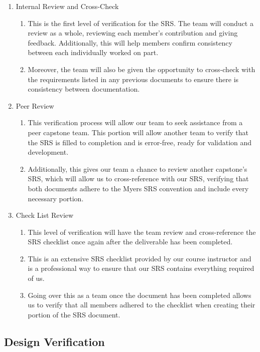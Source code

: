 \documentclass[12pt, titlepage]{article}
\begin{document}
\begin{enumerate}
\item Internal Review and Cross-Check
\begin{enumerate}
\item This is the first level of verification for the SRS. The team
will conduct a review as a whole, reviewing each member’s contribution
and giving feedback. Additionally, this will help members confirm
consistency between each individually worked on part.
\item Moreover, the team will also be given the opportunity to
cross-check with the requirements listed in any previous documents
to ensure there is consistency between documentation.
\end{enumerate}

\item Peer Review
\begin{enumerate}
\item This verification process will allow our team to seek assistance from
a peer capstone team. This portion will allow another team to verify that the
SRS is filled to completion and is error-free, ready for validation
and development.
\item Additionally, this gives our team a chance to review another capstone’s
SRS, which will allow us to cross-reference with our SRS, verifying that
both documents adhere to the Myers SRS convention and include every necessary portion.
\end{enumerate}

\item Check List Review
\begin{enumerate}
\item This level of verification will have the team review
 and cross-reference the SRS checklist once again after
 the deliverable has been completed.
\item This is an extensive SRS checklist provided by our
course instructor and is a professional way to ensure
that our SRS contains everything required of us.
\item Going over this as a team once the document has
been completed allows us to verify that all members
adhered to the checklist when creating their portion
of the SRS document.
\end{enumerate}
\end{enumerate}

\subsection{Design Verification}
\end{document}
